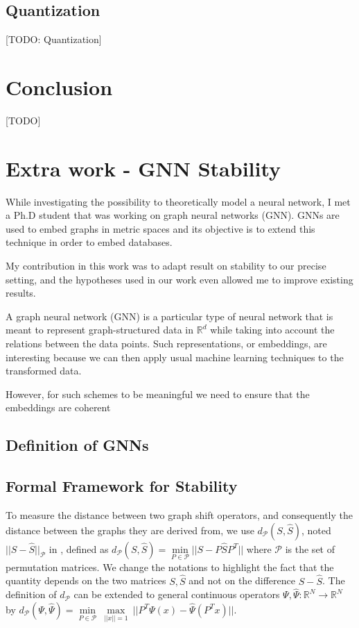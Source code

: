 \documentclass[11pt,a4paper]{article}
\newcommand{\bb}[1]{\mathbb{#1}}
\newcommand{\R}{\bb{R}}
\newcommand{\cP}{\mathcal{P}}
\theoremstyle{definition}
\begin{document}
		
\subsection{Quantization}
	
	[TODO: Quantization]
	
\section{Conclusion}

	[TODO]
	
	
\section{Extra work - GNN Stability}
	While investigating the possibility to theoretically model a neural network, I met a Ph.D student that was working on graph neural networks (GNN). GNNs are used to embed graphs in metric spaces and its objective is to extend this technique in order to embed databases.
	
	My contribution in this work was to adapt result on stability to our precise setting, and the hypotheses used in our work even allowed me to improve existing results.

	A graph neural network (GNN) is a particular type of neural network that is meant to represent graph-structured data in $\R^d$ while taking into account the relations between the data points. Such representations, or embeddings, are interesting because we can then apply usual machine learning techniques to the transformed data.
	
	However, for such schemes to be meaningful we need to ensure that the embeddings are coherent 

\subsection{Definition of GNNs}

	

\subsection{Formal Framework for Stability}

To measure the distance between two graph shift operators, and consequently the distance between the graphs they are derived from, we use $d_{\cP}(S, \hat{S})$, noted $||S - \hat{S}||_\cP$ in ,  defined as $d_\cP(S,\hat{S})=\underset{P \in \cP}{\min} ||S-P \hat{S} P^T ||$ where $\cP$ is the set of permutation matrices. We change the notations to highlight the fact that the quantity depends on the two matrices $S,\hat{S}$ and not on the difference $S-\hat{S}$. The definition of $d_\cP$ can be extended to general continuous operators $\Psi, \hat{\Psi}: \mathbb{R}^N \to \mathbb{R}^N$ by $d_\cP (\Psi, \hat{\Psi}) = \underset{P \in \cP}{\min} \ \underset{||x|| = 1}{\max} \ || P^T \Psi (x) - \hat{\Psi}(P^T x) ||$.
\end{document}
